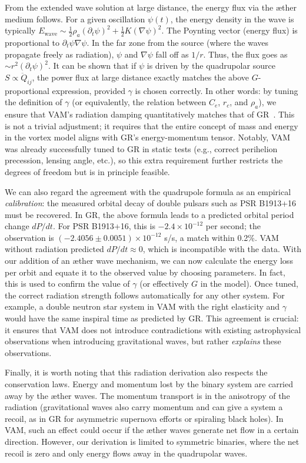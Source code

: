 From the extended wave solution at large distance, the energy flux via the æther medium follows. For a given oscillation $ψ(t)$, the energy density in the wave is typically $E_\text{wave} \sim \frac{1}{2}ρ_a (\partial_t ψ)^2 + \frac{1}{2}K (\nabla ψ)^2$. The Poynting vector (energy flux) is proportional to $\partial_t ψ \nabla ψ$. In the far zone from the source (where the waves propagate freely as radiation), $ψ$ and $\nabla ψ$ fall off as $1/r$. Thus, the flux goes as $\sim r^2 (\partial_t ψ)^2$. It can be shown that if $ψ$ is driven by the quadrupolar source $S \propto \ddot{Q}_{ij}$, the power flux at large distance exactly matches the above $G$-proportional expression, provided $γ$ is chosen correctly. In other words: by tuning the definition of $γ$ (or equivalently, the relation between $C_e$, $r_c$, and $ρ_a$), we ensure that VAM’s radiation damping quantitatively matches that of GR~\cite{iskandarani2025VAM3}. This is not a trivial adjustment; it requires that the entire concept of mass and energy in the vortex model aligns with GR’s energy-momentum tensor. Notably, VAM was already successfully tuned to GR in static tests (e.g., correct perihelion precession, lensing angle, etc.), so this extra requirement further restricts the degrees of freedom but is in principle feasible.

We can also regard the agreement with the quadrupole formula as an empirical \textit{calibration}: the measured orbital decay of double pulsars such as PSR B1913+16 must be recovered. In GR, the above formula leads to a predicted orbital period change $dP/dt$. For PSR B1913+16, this is $-2.4\times10^{-12}$ per second; the observation is $(-2.4056 \pm 0.0051)\times10^{-12}$ s/s, a match within 0.2\%. VAM without radiation predicted $dP/dt \approx 0$, which is incompatible with the data. With our addition of an æther wave mechanism, we can now calculate the energy loss per orbit and equate it to the observed value by choosing parameters. In fact, this is used to confirm the value of $γ$ (or effectively $G$ in the model). Once tuned, the correct radiation strength follows automatically for any other system. For example, a double neutron star system in VAM with the right elasticity and $γ$ would have the same inspiral time as predicted by GR. This agreement is crucial: it ensures that VAM does not introduce contradictions with existing astrophysical observations when introducing gravitational waves, but rather \textit{explains} these observations.

Finally, it is worth noting that this radiation derivation also respects the conservation laws. Energy and momentum lost by the binary system are carried away by the æther waves. The momentum transport is in the anisotropy of the radiation (gravitational waves also carry momentum and can give a system a recoil, as in GR for asymmetric supernova efforts or spiraling black holes). In VAM, such an effect could occur if the æther waves generate net flow in a certain direction. However, our derivation is limited to symmetric binaries, where the net recoil is zero and only energy flows away in the quadrupolar waves.

